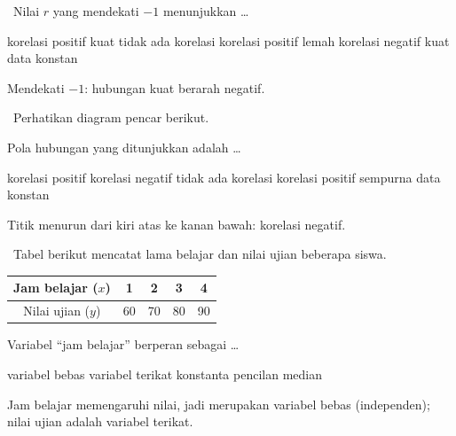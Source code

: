 \documentclass[11pt,a4paper]{exam}
\newcommand{\Inter}{{\footnotesize\textsf{\textcolor{biru}{[Intermediate]}}}\ }
\begin{document}
\begin{questions}
\question \Inter Nilai $r$ yang mendekati $-1$ menunjukkan \dots
\begin{choices}
\choice korelasi positif kuat
\choice tidak ada korelasi
\choice korelasi positif lemah
\CorrectChoice korelasi negatif kuat
\choice data konstan
\end{choices}
\begin{solution}Mendekati $-1$: hubungan kuat berarah negatif.\end{solution}

\question \Inter Perhatikan diagram pencar berikut.

\begin{center}
\end{center}

Pola hubungan yang ditunjukkan adalah \dots
\begin{choices}
\choice korelasi positif \CorrectChoice korelasi negatif \choice tidak ada korelasi
\choice korelasi positif sempurna \choice data konstan
\end{choices}
\begin{solution}Titik menurun dari kiri atas ke kanan bawah: korelasi negatif.\end{solution}

\question \Inter Tabel berikut mencatat lama belajar dan nilai ujian beberapa siswa.

\begin{center}\small
\begin{tabular}{|c|c|c|c|c|}
\hline
Jam belajar ($x$) & 1 & 2 & 3 & 4\\\hline
Nilai ujian ($y$) & 60 & 70 & 80 & 90\\\hline
\end{tabular}
\end{center}

Variabel ``jam belajar'' berperan sebagai \dots
\begin{choices}
\CorrectChoice variabel bebas \choice variabel terikat \choice konstanta
\choice pencilan \choice median
\end{choices}
\begin{solution}Jam belajar memengaruhi nilai, jadi merupakan variabel bebas
(independen); nilai ujian adalah variabel terikat.\end{solution}


\end{questions}
\end{document}
